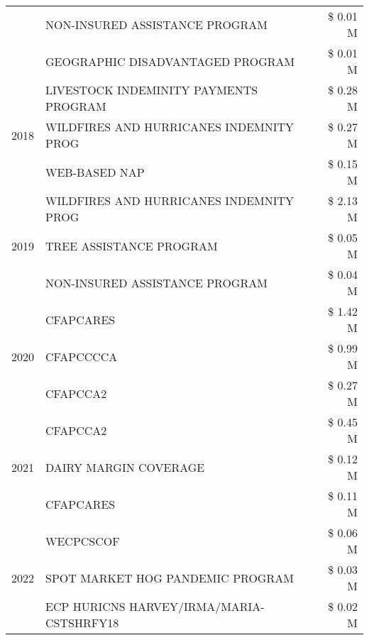 \begin{tabular}{llr}
 & NON-INSURED ASSISTANCE PROGRAM & \$ 0.01 M \\
 & GEOGRAPHIC DISADVANTAGED PROGRAM & \$ 0.01 M \\
\cline{1-3}
\multirow[t]{3}{*}{2018} & LIVESTOCK INDEMINITY PAYMENTS PROGRAM & \$ 0.28 M \\
 & WILDFIRES AND HURRICANES INDEMNITY PROG & \$ 0.27 M \\
 & WEB-BASED NAP & \$ 0.15 M \\
\cline{1-3}
\multirow[t]{3}{*}{2019} & WILDFIRES AND HURRICANES INDEMNITY PROG & \$ 2.13 M \\
 & TREE ASSISTANCE PROGRAM & \$ 0.05 M \\
 & NON-INSURED ASSISTANCE PROGRAM & \$ 0.04 M \\
\cline{1-3}
\multirow[t]{3}{*}{2020} & CFAPCARES & \$ 1.42 M \\
 & CFAPCCCCA & \$ 0.99 M \\
 & CFAPCCA2 & \$ 0.27 M \\
\cline{1-3}
\multirow[t]{3}{*}{2021} & CFAPCCA2 & \$ 0.45 M \\
 & DAIRY MARGIN COVERAGE & \$ 0.12 M \\
 & CFAPCARES & \$ 0.11 M \\
\cline{1-3}
\multirow[t]{3}{*}{2022} & WECPCSCOF & \$ 0.06 M \\
 & SPOT MARKET HOG PANDEMIC PROGRAM & \$ 0.03 M \\
 & ECP HURICNS HARVEY/IRMA/MARIA-CSTSHRFY18 & \$ 0.02 M \\
\cline{1-3}
\bottomrule
\end{tabular}
